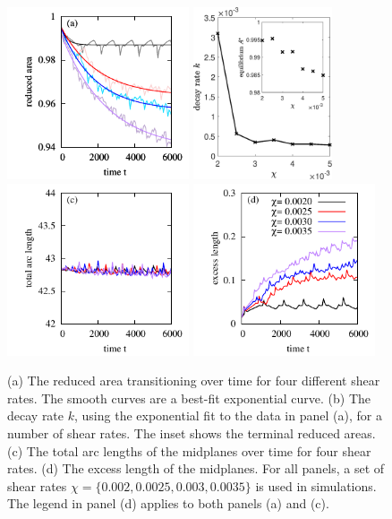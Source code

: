 \documentclass[lineno]{jfm}
\begin{document}
\begin{figure}
\begin{center}
\hspace{-0.6cm}
\includegraphics[height=2in]{ReducedArea.pdf}
\hspace{0.6cm}
\includegraphics[height=2in]{DecayRate.eps}\\
\includegraphics[height=2in]{ArcLength.pdf}
\includegraphics[height=2in]{ExcLength.pdf}
\end{center} 
  \caption{\label{figure4} (a) The reduced area transitioning over time
  for four different shear rates. The smooth curves are a best-fit
  exponential curve. (b) The decay rate $k$, using the exponential fit
  to the data in panel (a), for a number of shear rates. The inset shows
  the terminal reduced areas. (c) The total arc lengths of the midplanes
  over time for four shear rates. (d) The excess length of the
  midplanes. For all panels, a set of shear rates
  $\chi=\{0.002,0.0025,0.003,0.0035\}$ is used in simulations. The
  legend in panel (d) applies to both panels (a) and (c).}
\end{figure}
\end{document}
